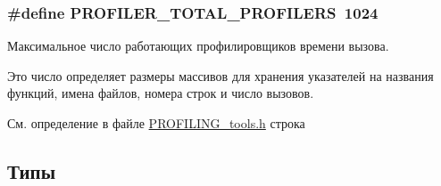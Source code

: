 \hypertarget{group___xD0_x9F_xD0_xBE_xD1_x80_xD1_x82_xD0_xB8_xD1_x80_xD1_x83_xD0_xB5_xD0_xBC_xD0_xB0_xD1_x8F_2ef1b31e26d7139e4bfe94879d1322e3_ga775939d541e95ea75e6e7066a1cc6bcb}{
\subsubsection[{\-P\-R\-O\-F\-I\-L\-E\-R\-\_\-\-T\-O\-T\-A\-L\-\_\-\-P\-R\-O\-F\-I\-L\-E\-R\-S}]{\setlength{\rightskip}{0pt plus 5cm}\#define {\bf \-P\-R\-O\-F\-I\-L\-E\-R\-\_\-\-T\-O\-T\-A\-L\-\_\-\-P\-R\-O\-F\-I\-L\-E\-R\-S}~1024}}\label{group___xD0_x9F_xD0_xBE_xD1_x80_xD1_x82_xD0_xB8_xD1_x80_xD1_x83_xD0_xB5_xD0_xBC_xD0_xB0_xD1_x8F_2ef1b31e26d7139e4bfe94879d1322e3_ga775939d541e95ea75e6e7066a1cc6bcb}


Максимальное число работающих профилировщиков времени вызова. 

Это число определяет размеры массивов для хранения указателей на названия функций, имена файлов, номера строк и число вызовов. 

См. определение в файле \hyperlink{_p_r_o_f_i_l_i_n_g__tools_8h_source}{\-P\-R\-O\-F\-I\-L\-I\-N\-G\-\_\-tools.\-h} строка 



\subsection{Типы}
\hypertarget{group___xD0_x9F_xD0_xBE_xD1_x80_xD1_x82_xD0_xB8_xD1_x80_xD1_x83_xD0_xB5_xD0_xBC_xD0_xB0_xD1_x8F_2ef1b31e26d7139e4bfe94879d1322e3_gae02193769f3b21a09fc0d5035e566a75}{
\subsubsection[{\-P\-R\-O\-F\-I\-L\-E\-R\-\_\-timestruct}]{}}\label{group___xD0_x9F_xD0_xBE_xD1_x80_xD1_x82_xD0_xB8_xD1_x80_xD1_x83_xD0_xB5_xD0_xBC_xD0_xB0_xD1_x8F_2ef1b31e26d7139e4bfe94879d1322e3_gae02193769f3b21a09fc0d5035e566a75}


